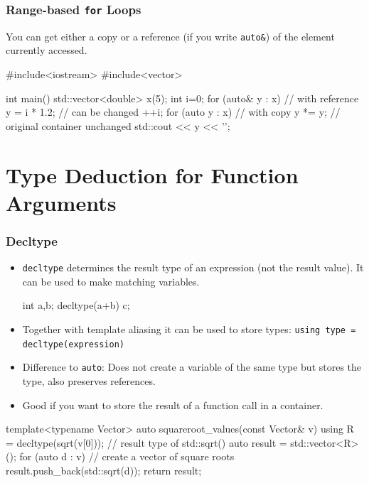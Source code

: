 \documentclass[aspectratio=169,ignorenonframetext,11pt]{beamer}
\def\inline{\lstinline[basicstyle=\small\ttfamily]}
\begin{document}
\begin{frame}[fragile]
  \frametitle<presentation>{Range-based \texttt{for} Loops}

  You can get either a copy or a reference (if you write \inline!auto&!) of the element currently accessed.

\begin{cppcode}
#include<iostream>
#include<vector>

int main() {
  std::vector<double> x(5);
  int i=0;
  for (auto& y : x) {       // with reference
    y = i * 1.2;            // can be changed
    ++i;
  }
  for (auto y : x) {        // with copy
    y *= y;                 // original container unchanged
    std::cout << y << '\n';
  }
}
\end{cppcode}

\end{frame}

\section{Type Deduction for Function Arguments}

\begin{frame}[fragile]
  \frametitle{Decltype}
\begin{itemize}
\item \lstinline!decltype! determines the result type of an expression (not the result value). It can be used to make matching variables.
\small
  \begin{cppcode}
int a,b;
decltype(a+b) c;
\end{cppcode}
\item Together with template aliasing it can 
be used to store types:
\inline!using type = decltype(expression)! 
\item Difference to \inline!auto!: Does not create a variable of the same type but stores the type, also preserves references.
\item Good if you want to store the result of a function call in a container.
\end{itemize}
\small
\begin{cppcode}
template<typename Vector>
auto squareroot_values(const Vector& v) {
  using R = decltype(sqrt(v[0])); // result type of std::sqrt()
  auto result = std::vector<R>();
  for (auto d : v)                // create a vector of square roots
    result.push_back(std::sqrt(d)); 
  return result;
}
\end{cppcode}
\end{frame}
\end{document}
